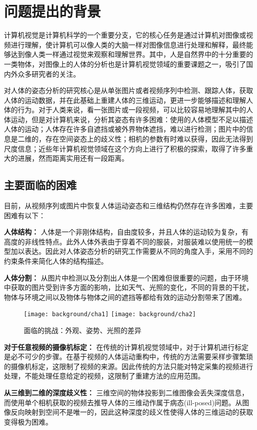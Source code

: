 \section{问题提出的背景}
计算机视觉是计算机科学的一个重要分支，它的核心任务是通过计算机对图像或视频进行理解，使计算机可以像人类的大脑一样对图像信息进行处理和解释，最终能够达到像人类一样通过视觉来观察和理解世界。其中，人是自然界中的十分重要的一类物体，对图像上的人体的分析也是计算机视觉领域的重要课题之一，吸引了国内外众多研究者的关注。

对人体的姿态分析的研究核心是从单张图片或者视频序列中检测、跟踪人体，获取人体的运动数据，并在此基础上重建人体的三维运动，更进一步能够描述和理解人体的行为。对于人类来说，看一张图片或一段视频，可以比较容易地理解其中的人体运动，但是对计算机来说，分析其姿态有许多困难：使用的人体模型不足以描述人体的运动；人体存在许多自遮挡或被外界物体遮挡，难以进行检测；图片中的信息是二维的，存在空间姿态上的歧义性；相机的参数有时难以获得，因此无法得到尺度信息；近些年计算机视觉领域在这个方向上进行了积极的探索，取得了许多重大的进展，然而距离实用还有一段距离。

\subsection{主要面临的困难}
目前，从视频序列或图片中恢复人体运动姿态和三维结构仍然存在许多困难，主要困难有以下：

\textbf{人体结构：}
人体是一个非刚体结构，自由度较多，并且人体的运动较为复杂，有高度的非线性特点。此外人体外表由于穿着不同的服装，对服装难以使用统一的模型加以表达。因此对人体姿态分析的研究工作需要从不同的角度入手，采用不同的约束条件来简化人体的结构描述。

\textbf{人体分割：}
从图片中检测以及分割出人体是一个困难但很重要的问题，由于环境中获取的图片受到许多方面的影响，比如天气、光照的变化，不同的背景的干扰，物体与环境之间以及物体与物体之间的遮挡等都给有效的运动分割带来了困难。
\begin{figure}[ht]
    \centering
    \texttt{[image: background/cha1]}
    \texttt{[image: background/cha2]}
    \caption{\label{fig:cha2}面临的挑战：外观、姿势、光照的差异}
\end{figure}

\textbf{对于任意视频的摄像机标定：}
在传统的计算机视觉领域中，对于计算机进行标定是必不可少的步骤。在基于视频的人体运动重构中，传统的方法需要采样步骤繁琐的摄像机标定，这限制了视频的来源。因此传统的方法只能对特定采集的视频进行处理，不能处理任意给定的视频，这限制了重建方法的应用范围。

\textbf{从三维到二维的深度歧义性：}
三维空间的物体投影到二维图像会丢失深度信息，而使用单个相机获取的视频去推导人体的三维动作属于病态(ill-posed)问题。从图像反向映射到空间不是唯一的，因此这种深度的歧义性使得人体的三维运动的获取变得极为困难。

